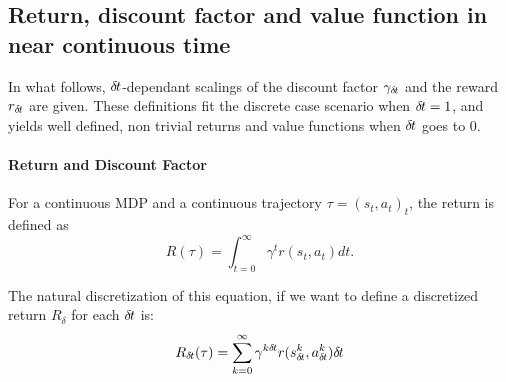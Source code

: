 % 
      

\subsection{Return, discount factor and value function in near continuous time}
\label{sec:ret-gamma-v}



In what follows, ${\delta\hspace{-.1em}t}$-dependant scalings of the discount factor $\gamma_{\delta\hspace{-.1em}t}$
and the reward $r_{\delta\hspace{-.1em}t}$ are given. These definitions fit the discrete case
scenario when ${\delta\hspace{-.1em}t}=1$, and yields well defined, non trivial returns
and value functions when ${\delta\hspace{-.1em}t}$ goes to $0$.

\paragraph{Return and Discount Factor}
For a continuous MDP and a continuous trajectory $\tau = (s_t, a_t)_t$,
the return is defined as~\cite{cont_rl}
\begin{equation}
\label{eq:continuous-return}
R(\tau) = \int_{t=0}^\infty\gamma^tr(s_t, a_t)dt.
\end{equation}

The natural discretization of this equation, if we want to define a discretized
return $R_\delta$ for each ${\delta\hspace{-.1em}t}$ is:
\begin{equation}
\label{eq:discretized-return}
R_{\delta\hspace{-.1em}t}(\tau) = \sum_{k=0}^\infty\gamma^{k{\delta\hspace{-.1em}t}}
r(s_{\delta\hspace{-.1em}t}^k, a_{\delta\hspace{-.1em}t}^k){\delta\hspace{-.1em}t}
\end{equation}

